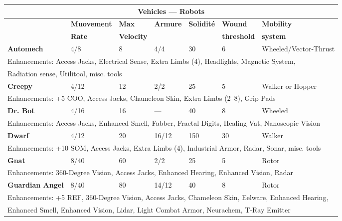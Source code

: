 {{\begin{table}
\begin{tabular}{|l|l|l|l|l|l|l|}
\multicolumn{7}{|c|}{\textbf{Vehicles --- Robots}} \\ \hline

&\textbf{Muovement}	&\textbf{Max}	&\textbf{Armure}	&\textbf{Solidité}	&\textbf{Wound}	&\textbf{Mobility} \\ &\textbf{Rate}	&\textbf{Velocity}	&&&\textbf{threshold}	&\textbf{system} \\ \hline

\textbf{Automech}	&4/8	&8	&4/4	&30	&6	&Wheeled/Vector-Thrust \\ \hline

\multicolumn{7}{|l|}{Enhancements: Access Jacks, Electrical Sense, Extra Limbs (4), Headlights, Magnetic System, } \\ \multicolumn{7}{|l|}{Radiation sense, Utilitool, misc. tools} \\ \hline

\textbf{Creepy}	&4/12	&12	&2/2	&25	&5	&Walker or Hopper \\ \hline

\multicolumn{7}{|l|}{Enhancements: +5 COO, Access Jacks, Chameleon Skin, Extra Limbs (2--8), Grip Pads} \\ \hline

\textbf{Dr. Bot}	&4/16	&16	&--- &40	&8	&Wheeled \\ \hline

\multicolumn{7}{|l|}{Enhancements: Access Jacks, Enhanced Smell, Fabber, Fractal Digits, Healing Vat, Nanoscopic Vision} \\ \hline

\textbf{Dwarf}	&4/12	&20	&16/12	&150	&30	&Walker \\ \hline

\multicolumn{7}{|l|}{Enhancements: +10 SOM, Access Jacks, Extra Limbs (4), Industrial Armor, Radar, Sonar, misc. tools} \\ \hline

\textbf{Gnat}	&8/40	&60	&2/2	&25	&5	&Rotor \\ \hline

\multicolumn{7}{|l|}{Enhancements: 360-Degree Vision, Access Jacks, Enhanced Hearing, Enhanced Vision, Radar} \\ \hline

\textbf{Guardian Angel}	&8/40	&80	&14/12	&40	&8	&Rotor \\ \hline

\multicolumn{7}{|l|}{Enhancements: +5 REF, 360-Degree Vision, Access Jacks, Chameleon Skin, Eelware, Enhanced Hearing, } \\ \multicolumn{7}{|l|}{Enhanced Smell, Enhanced Vision, Lidar, Light Combat Armor, Neurachem, T-Ray Emitter} \\ \hline


\end{tabular}
\end{table}}}
